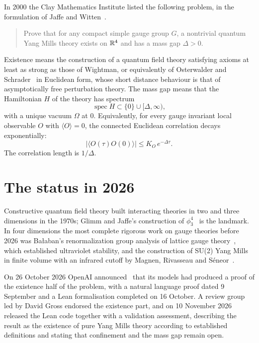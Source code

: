 In 2000 the Clay Mathematics Institute listed the following problem, in the formulation of Jaffe and Witten~\cite{JW}.

\begin{quote}
Prove that for any compact simple gauge group $G$, a nontrivial quantum Yang Mills theory exists on $\mathbb{R}^4$ and has a mass gap $\Delta>0$.
\end{quote}

Existence means the construction of a quantum field theory satisfying axioms at least as strong as those of Wightman, or equivalently of Osterwalder and Schrader~\cite{OS} in Euclidean form, whose short distance behaviour is that of asymptotically free perturbation theory. The mass gap means that the Hamiltonian $H$ of the theory has spectrum
\[
\operatorname{spec}H\subset\{0\}\cup[\Delta,\infty),
\]
with a unique vacuum $\Omega$ at $0$. Equivalently, for every gauge invariant local observable $O$ with $\langle O\rangle=0$, the connected Euclidean correlation decays exponentially:
\[
\big|\langle O(\tau)O(0)\rangle\big|\le K_O\,e^{-\Delta\tau}.
\]
The correlation length is $1/\Delta$.

\section{The status in 2026}

Constructive quantum field theory built interacting theories in two and three dimensions in the 1970s; Glimm and Jaffe's construction of $\phi^4_3$~\cite{GJ} is the landmark. In four dimensions the most complete rigorous work on gauge theories before 2026 was Ba\l aban's renormalization group analysis of lattice gauge theory~\cite{Ba87}, which established ultraviolet stability, and the construction of SU(2) Yang Mills in finite volume with an infrared cutoff by Magnen, Rivasseau and S\'eneor~\cite{MRS}.

On 26 October 2026 OpenAI announced~\cite{OAI} that its models had produced a proof of the existence half of the problem, with a natural language proof dated 9 September and a Lean formalisation completed on 16 October. A review group led by David Gross endorsed the existence part, and on 10 November 2026 released the Lean code together with a validation assessment, describing the result as the existence of pure Yang Mills theory according to established definitions and stating that confinement and the mass gap remain open.

